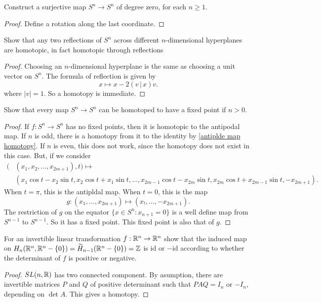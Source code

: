 \begin{exercise}
Construct a surjective map $S^n\to S^n$ of degree zero, for each $n\geq 1$.
\end{exercise}
\begin{proof}
Define a rotation along the last coordinate.
\end{proof}
\begin{exercise}
Show that any two reflections of $S^n$ across different $n$-dimensional hyperplanes are homotopic, in fact homotopic through reflections
\end{exercise}
\begin{proof}
Choosing an $n$-dimensional hyperplane is the same as choosing a unit vector on $S^n$. The formula of reflection is given by
\[x\mapsto x-2(v\,|\,x)v.\]
where $|v|=1$. So a homotopy is immediate.
\end{proof}
\begin{exercise}
Show that every map $S^n\to S^n$ can be homotoped to have a fixed point if $n>0$.
\end{exercise}
\begin{proof}
If $f:S^n\to S^n$ has no fixed points, then it is homotopic to the antipodal map. If $n$ is odd, there is a homotopy from it to the identity by \cref{antiplde map homotopy}. If $n$ is even, this does not work, since the homotopy does not exist in this case. But, if we consider
\begin{align*}
\big(&(x_1,x_2,...,x_{2m+1}),t\big)\mapsto\\
&(x_1\cos t-x_2\sin t,x_2\cos t+x_1\sin t,\dots,x_{2m-1}\cos t-x_{2m}\sin t,x_{2m}\cos t+x_{2m-1}\sin t,-x_{2m+1}).
\end{align*}
When $t=\pi$, this is the antipldal map. When $t=0$, this is the map
\[g:(x_1,\dots,x_{2m+1})\mapsto(x_!,\dots,-x_{2m+1}).\]
The restriction of $g$ on the equator $\{x\in S^n:x_{n+1}=0\}$ is a well define map from $S^{n-1}$ to $S^{n-1}$. So it has a fixed point. This fixed point is also that of $g$.
\end{proof}
\begin{exercise}\label{matrix local homology}
For an invertible linear transformation $f:\mathbb{R}^n\to\mathbb{R}^n$ show that the induced map on $H_n(\mathbb{R}^n,\mathbb{R}^n-\{0\})=\widetilde{H}_{n-1}(\mathbb{R}^n-\{0\})=\mathbb{Z}$ is $\mathrm{id}$ or $-\mathrm{id}$ according to whether the determinant of $f$ is positive or negative.
\end{exercise}
\begin{proof}
$SL(n,\mathbb{R})$ has two connected component. By asumption, there are invertible matrices $P$ and $Q$ of positive determinant such that $PAQ=I_n$ or $-I_n$, depending on $\det A$. This gives a homotopy.
\end{proof}
